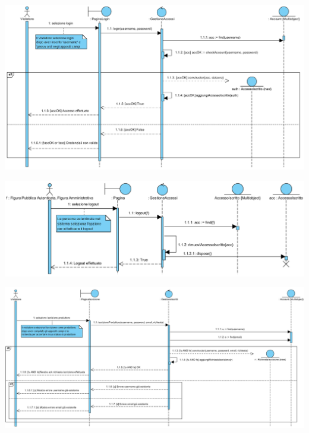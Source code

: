 \begin{landscape}
\begin{center}
			\includegraphics[width=\linewidth]{assets/visualParadigm/sequenza/Login}
\end{center}
\end{landscape}

\begin{landscape}
\begin{center}
			\includegraphics[width=\linewidth]{assets/visualParadigm/sequenza/Logout}
\end{center}
\end{landscape}

\begin{landscape}
\begin{center}
			\includegraphics[width=\linewidth]{assets/visualParadigm/sequenza/iscrizioneProduttore}
\end{center}
\end{landscape}

